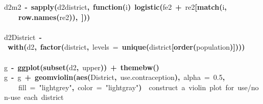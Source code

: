 \documentclass{article}
\makeatletter
\newcommand{\hlnumber}[1]{\textcolor[rgb]{0,0,0}{#1}}%
\newcommand{\hlfunctioncall}[1]{\textcolor[rgb]{.5,0,.33}{\textbf{#1}}}%
\newcommand{\hlstring}[1]{\textcolor[rgb]{.6,.6,1}{#1}}%
\newcommand{\hlkeyword}[1]{\textbf{#1}}%
\newcommand{\hlargument}[1]{\textcolor[rgb]{.69,.25,.02}{#1}}%
\newcommand{\hlcomment}[1]{\textcolor[rgb]{.18,.6,.34}{#1}}%
\newcommand{\hlformalargs}[1]{\hlargument{#1}}%
\newcommand{\hlassignement}[1]{\textbf{#1}}%
\newcommand{\hlsymbol}[1]{#1}%
\newcommand{\hlstd}[1]{\textcolor[rgb]{0,0,0}{#1}}%
\newenvironment{kframe}{%
 \def\FrameCommand##1{\hskip\@totalleftmargin \hskip-\fboxsep
 \colorbox{shadecolor}{##1}\hskip-\fboxsep
     \hskip-\linewidth \hskip-\@totalleftmargin \hskip\columnwidth}%
 \MakeFramed {\advance\hsize-\width
   \@totalleftmargin\z@ \linewidth\hsize
   \@setminipage}}%
 {\par\unskip\endMakeFramed}
\newenvironment{knitrout}{}{} %
\makeatother
\begin{document}
\begin{knitrout}
{\begin{kframe}
\begin{flushleft}
\hlstd{}\hlsymbol{d2}\hlkeyword{\usebox{\hlnormalsizeboxdollar}}\hlsymbol{m2}{\ }\hlassignement{\usebox{\hlnormalsizeboxlessthan}-}{\ }\hlfunctioncall{sapply}\hlkeyword{(}\hlsymbol{d2}\hlkeyword{\usebox{\hlnormalsizeboxdollar}}\hlsymbol{district}\hlkeyword{,}{\ }\hlkeyword{function}\hlkeyword{(}\hlformalargs{i}\hlkeyword{)}{\ }\hlfunctioncall{logistic}\hlkeyword{(}\hlsymbol{fe2}{\ }\hlkeyword{+}{\ }\hlsymbol{re2}\hlkeyword{[}\hlfunctioncall{match}\hlkeyword{(}\hlsymbol{i}\hlkeyword{,}\hspace*{\fill}\\
\hlstd{}{\ }{\ }{\ }{\ }\hlfunctioncall{row.names}\hlkeyword{(}\hlsymbol{re2}\hlkeyword{)}\hlkeyword{)}\hlkeyword{,}{\ }\hlkeyword{]}\hlkeyword{)}\hlkeyword{)}\hspace*{\fill}\\
\hlstd{}\hspace*{\fill}\\
\hlstd{}\hlsymbol{d2}\hlkeyword{\usebox{\hlnormalsizeboxdollar}}\hlsymbol{District}{\ }\hlassignement{\usebox{\hlnormalsizeboxlessthan}-}{\ }\hlfunctioncall{with}\hlkeyword{(}\hlsymbol{d2}\hlkeyword{,}{\ }\hlfunctioncall{factor}\hlkeyword{(}\hlsymbol{district}\hlkeyword{,}{\ }\hlargument{levels}{\ }\hlargument{=}{\ }\hlfunctioncall{unique}\hlkeyword{(}\hlsymbol{district}\hlkeyword{[}\hlfunctioncall{order}\hlkeyword{(}\hlsymbol{population}\hlkeyword{)}\hlkeyword{]}\hlkeyword{)}\hlkeyword{)}\hlkeyword{)}\hspace*{\fill}\\
\hlstd{}\hspace*{\fill}\\
\hlstd{}\hlsymbol{g}{\ }\hlassignement{\usebox{\hlnormalsizeboxlessthan}-}{\ }\hlfunctioncall{ggplot}\hlkeyword{(}\hlfunctioncall{subset}\hlkeyword{(}\hlsymbol{d2}\hlkeyword{,}{\ }\hlsymbol{upper}\hlkeyword{)}\hlkeyword{)}{\ }\hlkeyword{+}{\ }\hlfunctioncall{theme\usebox{\hlnormalsizeboxunderscore}bw}\hlkeyword{(}\hlkeyword{)}\hspace*{\fill}\\
\hlstd{}\hlsymbol{g}{\ }\hlassignement{\usebox{\hlnormalsizeboxlessthan}-}{\ }\hlsymbol{g}{\ }\hlkeyword{+}{\ }\hlfunctioncall{geom\usebox{\hlnormalsizeboxunderscore}violin}\hlkeyword{(}\hlfunctioncall{aes}\hlkeyword{(}\hlsymbol{District}\hlkeyword{,}{\ }\hlsymbol{use.contraception}\hlkeyword{)}\hlkeyword{,}{\ }\hlargument{alpha}{\ }\hlargument{=}{\ }\hlnumber{0.5}\hlkeyword{,}\hspace*{\fill}\\
\hlstd{}{\ }{\ }{\ }{\ }\hlargument{fill}{\ }\hlargument{=}{\ }\hlstring{"lightgrey"}\hlkeyword{,}{\ }\hlargument{color}{\ }\hlargument{=}{\ }\hlstring{"lightgray"}\hlkeyword{)}{\ }{\ }\hlcomment{\usebox{\hlnormalsizeboxhash}\usebox{\hlnormalsizeboxhash}{\ }construct{\ }a{\ }violin{\ }plot{\ }for{\ }use/non-use{\ }each{\ }district}\hspace*{\fill}\\

\end{flushleft}
\end{kframe}}
\end{knitrout}
\end{document}
